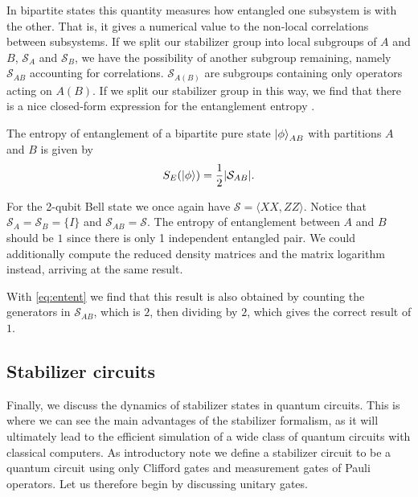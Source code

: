 In bipartite states this quantity measures how entangled one subsystem is with
the other. That is, it gives a numerical value to the non-local correlations between
subsystems. If we split our stabilizer group into local subgroups of $A$ and
$B$, $\mathcal{S}_A$ and $\mathcal{S}_B$, we have the possibility of another
subgroup remaining, namely $\mathcal{S}_{AB}$ accounting for correlations.
$\mathcal{S}_{A(B)}$ are subgroups containing only operators acting on $A (B)$.
If we split our stabilizer group in this way, we find that there is a nice
closed-form expression for the entanglement entropy
\cite{fattalEntanglementStabilizerFormalism2004}.

\begin{thm}\label{thm:entent}
  The entropy of entanglement of a bipartite pure state $\ket{\phi}_{AB}$ with
  partitions $A$ and $B$ is given
  by
  \begin{align}\label{eq:entent}
    S_E(\ket{\phi}) = \frac{1}{2}\abs{\mathcal{S}_{AB}}
  .\end{align}
\end{thm}
For
the 2-qubit Bell state we once again have $\mathcal{S} = \langle XX,
ZZ\rangle$. Notice that $\mathcal{S}_A = \mathcal{S}_B = \{I\}$ and $\mathcal{S}_{AB} =
\mathcal{S}$. 
The entropy of entanglement between $A$ and $B$ should be $1$
since there is only 1 independent entangled pair. We could additionally compute
the reduced density matrices and the matrix logarithm instead, arriving at the
same result.

With \cref{eq:entent} we find that this result is also obtained by counting the
generators in $\mathcal{S}_{AB}$, which is $2$, then dividing by $2$, which
gives the correct result of $1$. 
\subsection{Stabilizer circuits}

Finally, we discuss the dynamics of stabilizer states in quantum circuits. This
is where we can see the main advantages of the stabilizer formalism, as it will
ultimately lead to the efficient simulation of a wide class of quantum circuits
with classical computers. 
As introductory note we define a stabilizer circuit to be a quantum
circuit using only Clifford gates and measurement gates of Pauli operators. Let
us therefore begin by discussing unitary gates.

